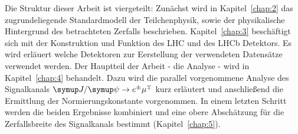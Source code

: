 Die Struktur dieser Arbeit ist viergeteilt: Zunächst wird in Kapitel~\ref{chap:2} das zugrundeliegende Standardmodell der Teilchenphysik, sowie der physikalische Hintergrund des betrachteten Zerfalls beschrieben. Kapitel~\ref{chap:3} beschäftigt sich mit der Konstruktion und Funktion des LHC und des LHCb Detektors. Es wird erläuert welche Detektoren zur Eerstellung der verwendeten Datensätze verwendet werden. Der Hauptteil der Arbeit - die Analyse - wird in Kapitel~\ref{chap:4} behandelt. Dazu wird die parallel vorgenommene Analyse des Signalkanals $\signal$ kurz erläutert und anschließend die Ermittlung der Normierungskonstante vorgenommen. In einem letzten Schritt werden die beiden Ergebnisse kombiniert und eine obere Abschätzung für die Zerfallsbreite des Signalkanals bestimmt (Kapitel~\ref{chap:5}).
